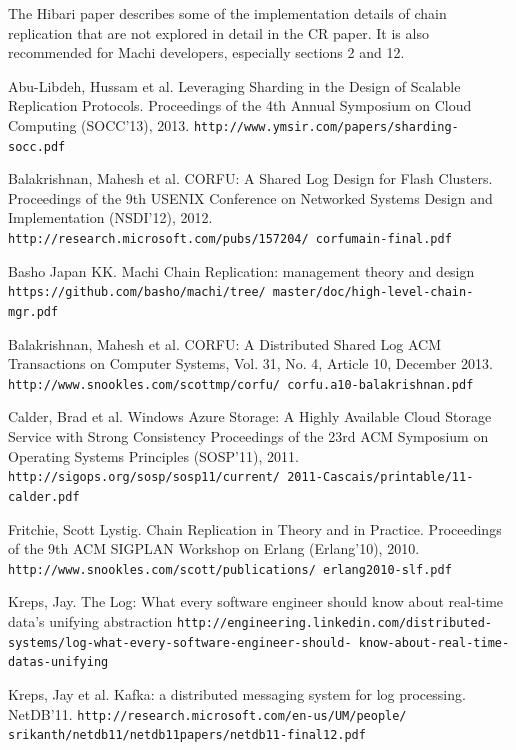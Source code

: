 \documentclass[preprint,10pt]{sigplanconf}
\begin{document}
The Hibari paper \cite{cr-theory-and-practice} describes some of the
implementation details of chain replication that are not explored in
detail in the CR paper.  It is also recommended for Machi developers,
especially sections 2 and 12.


\begin{thebibliography}{}
\softraggedright

Abu-Libdeh, Hussam et al.
Leveraging Sharding in the Design of Scalable Replication Protocols.
Proceedings of the 4th Annual Symposium on Cloud Computing (SOCC'13), 2013.
{\tt http://www.ymsir.com/papers/sharding-socc.pdf}

Balakrishnan, Mahesh et al.
CORFU: A Shared Log Design for Flash Clusters.
Proceedings of the 9th USENIX Conference on Networked Systems Design
and Implementation (NSDI'12), 2012.
{\tt http://research.microsoft.com/pubs/157204/ corfumain-final.pdf}

Basho Japan KK.
Machi Chain Replication: management theory and design
{\tt https://github.com/basho/machi/tree/ master/doc/high-level-chain-mgr.pdf}

Balakrishnan, Mahesh et al.
CORFU: A Distributed Shared Log
ACM Transactions on Computer Systems, Vol. 31, No. 4, Article 10, December 2013.
{\tt http://www.snookles.com/scottmp/corfu/ corfu.a10-balakrishnan.pdf}

Calder, Brad et al.
Windows Azure Storage: A Highly Available Cloud Storage Service with Strong Consistency
Proceedings of the 23rd ACM Symposium on Operating Systems Principles (SOSP'11), 2011.
{\tt http://sigops.org/sosp/sosp11/current/ 2011-Cascais/printable/11-calder.pdf}

Fritchie, Scott Lystig.
Chain Replication in Theory and in Practice.
Proceedings of the 9th ACM SIGPLAN Workshop on Erlang (Erlang'10), 2010.
{\tt http://www.snookles.com/scott/publications/ erlang2010-slf.pdf}

Kreps, Jay.
The Log: What every software engineer should know about real-time data's unifying abstraction
{\tt http://engineering.linkedin.com/distributed-
  systems/log-what-every-software-engineer-should-
  know-about-real-time-datas-unifying}

Kreps, Jay et al.
Kafka: a distributed messaging system for log processing.
NetDB’11.
{\tt http://research.microsoft.com/en-us/UM/people/
  srikanth/netdb11/netdb11papers/netdb11-final12.pdf}


\end{thebibliography}
\end{document}
